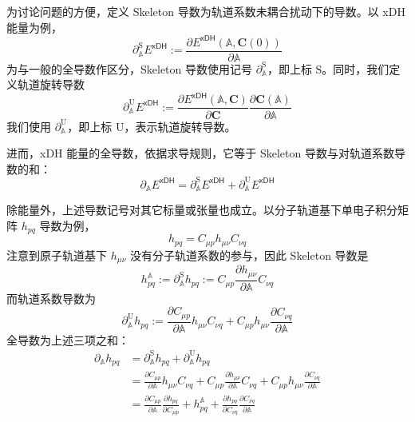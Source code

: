 为讨论问题的方便，定义 Skeleton 导数为轨道系数未耦合扰动下的导数。以 xDH 能量为例，
\begin{equation}
  \partial_{\mathbb{A}}^\mathrm{S} E^\textsf{xDH} := \frac{\partial E^\textsf{xDH} (\mathbb{A}, \mathbf{C} (0))}{\partial \mathbb{A}}
\end{equation}
为与一般的全导数作区分，Skeleton 导数使用记号 $\partial_{\mathbb{A}}^\mathrm{S}$，即上标 $\mathrm{S}$。同时，我们定义轨道旋转导数
\begin{equation}
  \partial_{\mathbb{A}}^\mathrm{U} E^\textsf{xDH} := \frac{\partial E^\textsf{xDH} (\mathbb{A}, \mathbf{C})}{\partial \mathbf{C}} \frac{\partial \mathbf{C} (\mathbb{A})}{\partial \mathbb{A}}
\end{equation}
我们使用 $\partial_{\mathbb{A}}^\mathrm{U}$，即上标 $\mathrm{U}$，表示轨道旋转导数。

进而，xDH 能量的全导数，依据求导规则，它等于 Skeleton 导数与对轨道系数导数的和：
\begin{equation}
  \partial_{\mathbb{A}} E^\textsf{xDH} = \partial_{\mathbb{A}}^\mathrm{S} E^\textsf{xDH} + \partial_{\mathbb{A}}^\mathrm{U} E^\textsf{xDH}
\end{equation}

除能量外，上述导数记号对其它标量或张量也成立。以分子轨道基下单电子积分矩阵 $h_{pq}$ 导数为例，
\begin{equation*}
  h_{pq} = C_{\mu p} h_{\mu \nu} C_{\nu q}
\end{equation*}
注意到原子轨道基下 $h_{\mu \nu}$ 没有分子轨道系数的参与，因此 Skeleton 导数是
\begin{equation*}
  h_{pq}^{\mathbb{A}} := \partial_{\mathbb{A}}^\mathrm{S} h_{pq} := C_{\mu p} \frac{\partial h_{\mu \nu}}{\partial \mathbb{A}} C_{\nu q}
\end{equation*}
而轨道系数导数为
\begin{equation*}
  \partial_{\mathbb{A}}^\mathrm{U} h_{pq} := \frac{\partial C_{\mu p}}{\partial \mathbb{A}} h_{\mu \nu} C_{\nu q} + C_{\mu p} h_{\mu \nu} \frac{\partial C_{\nu q}}{\partial \mathbb{A}}
\end{equation*}
全导数为上述三项之和：
\begin{align*}
  \partial_{\mathbb{A}} h_{pq} &= \partial_{\mathbb{A}}^\mathrm{S} h_{pq} + \partial_{\mathbb{A}}^\mathrm{U} h_{pq} \\
  &= \frac{\partial C_{\mu p}}{\partial \mathbb{A}} h_{\mu \nu} C_{\nu q} + C_{\mu p} \frac{\partial h_{\mu \nu}}{\partial \mathbb{A}} C_{\nu q} + C_{\mu p} h_{\mu \nu} \frac{\partial C_{\nu q}}{\partial \mathbb{A}} \\
  &= \frac{\partial C_{\mu p}}{\partial \mathbb{A}} \frac{\partial h_{pq}}{\partial C_{\mu p}} + h_{pq}^{\mathbb{A}} + \frac{\partial h_{pq}}{\partial C_{\nu q}} \frac{\partial C_{\nu q}}{\partial \mathbb{A}}
\end{align*}


